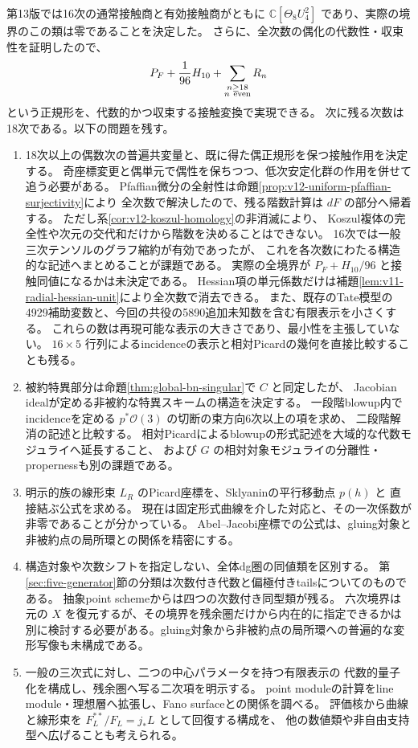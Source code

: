 \documentclass[a4paper,11pt]{ltjsarticle}
\theoremstyle{definition}
\newcommand{\CC}{\mathbb C}
\newcommand{\OO}{\mathcal O}
\begin{document}
第13版では16次の通常接触商と有効接触商がともに
$\CC[\Theta_8U_4^2]$ であり、実際の境界のこの類は零であることを決定した。
さらに、全次数の偶化の代数性・収束性を証明したので、
\[
 P_F+\frac1{96}H_{10}
       +\sum_{\substack{n\ge18\\n\ {\rm even}}}R_n
\]
という正規形を、代数的かつ収束する接触変換で実現できる。
次に残る次数は18次である。以下の問題を残す。
\begin{enumerate}
 \item 18次以上の偶数次の普遍共変量と、既に得た偶正規形を保つ接触作用を決定する。
 奇座標変更と偶単元で偶性を保ちつつ、低次安定化群の作用を併せて追う必要がある。
 Pfaffian微分の全射性は命題\ref{prop:v12-uniform-pfaffian-surjectivity}により
 全次数で解決したので、残る階数計算は $dF$ の部分へ帰着する。
 ただし系\ref{cor:v12-koszul-homology}の非消滅により、
 Koszul複体の完全性や次元の交代和だけから階数を決めることはできない。
 16次では一般三次テンソルのグラフ縮約が有効であったが、
 これを各次数にわたる構造的な記述へまとめることが課題である。
 実際の全境界が $P_F+H_{10}/96$ と接触同値になるかは未決定である。
 Hessian項の単元係数だけは補題\ref{lem:v11-radial-hessian-unit}により全次数で消去できる。
 また、既存のTate模型の4929補助変数と、今回の共役の5890追加未知数を含む有限表示を小さくする。
 これらの数は再現可能な表示の大きさであり、最小性を主張していない。
 $16\times5$ 行列によるincidenceの表示と相対Picardの幾何を直接比較することも残る。
 \item 被約特異部分は命題\ref{thm:global-bn-singular}で $C$ と同定したが、
 Jacobian idealが定める非被約な特異スキームの構造を決定する。
 一段階blowup内でincidenceを定める $p^*\OO(3)$ の切断の束方向6次以上の項を求め、
 二段階解消の記述と比較する。
 相対Picardによるblowupの形式記述を大域的な代数モジュライへ延長すること、
 および $G$ の相対対象モジュライの分離性・propernessも別の課題である。
 \item 明示的族の線形束 $L_R$ のPicard座標を、Sklyaninの平行移動点 $p(h)$ と
 直接結ぶ公式を求める。
 現在は固定形式曲線を介した対応と、その一次係数が非零であることが分かっている。
 Abel--Jacobi座標での公式は、gluing対象と非被約点の局所環との関係を精密にする。
 \item 構造対象や次数シフトを指定しない、全体dg圏の同値類を区別する。
 第\ref{sec:five-generator}節の分類は次数付き代数と偏極付きtailsについてのものである。
 抽象point schemeからは四つの次数付き同型類が残る。
 六次境界は元の $X$ を復元するが、その境界を残余圏だけから内在的に指定できるかは
 別に検討する必要がある。gluing対象から非被約点の局所環への普遍的な変形写像も未構成である。
 \item 一般の三次式に対し、二つの中心パラメータを持つ有限表示の
 代数的量子化を構成し、残余圏へ写る二次項を明示する。
 point moduleの計算をline module・理想層へ拡張し、Fano surfaceとの関係を調べる。
 評価核から曲線と線形束を $F_L^{**}/F_L=j_*L$ として回復する構成を、
 他の数値類や非自由支持型へ広げることも考えられる。
\end{enumerate}
\end{document}
